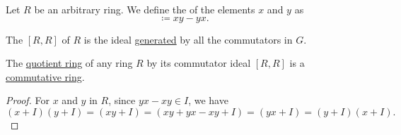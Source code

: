 \begin{definition}\label{def:ring_commutator}
  Let \( R \) be an arbitrary ring. We define the  of the elements \( x \) and \( y \) as
  \begin{equation*}
    [x, y] \coloneqq xy - yx.
  \end{equation*}

  The  \( [R, R] \) of \( R \) is the ideal \hyperref[def:generated_ring_ideal]{generated} by all the commutators in \( G \).
\end{definition}

\begin{proposition}\label{thm:quotient_by_commutator_ideal}
  The \hyperref[def:quotient_semiring]{quotient ring} of any ring \( R \) by its commutator ideal \( [R, R] \) is a \hyperref[def:ring/commutative]{commutative ring}.
\end{proposition}
\begin{proof}
  For \( x \) and \( y \) in \( R \), since \( yx - xy \in I \), we have
  \begin{equation*}
    (x + I) (y + I)
    =
    (xy + I)
    =
    (xy + yx - xy + I)
    =
    (yx + I)
    =
    (y + I) (x + I).
  \end{equation*}
\end{proof}
